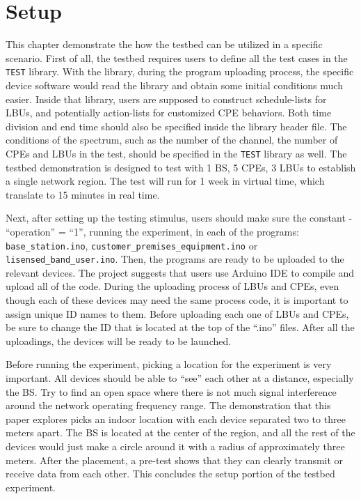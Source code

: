 \section{Setup}

This chapter demonstrate the how the testbed can be utilized in a specific scenario. First of all, the testbed requires users to define all the test cases in the \texttt{TEST} library. With the library, during the program uploading process, the specific device software would read the library and obtain some initial conditions much easier. Inside that library, users are supposed to construct schedule-lists for LBUs, and potentially action-lists for customized CPE behaviors. Both time division and end time should also be specified inside the library header file. The conditions of the spectrum, such as the number of the channel, the number of CPEs and LBUs in the test, should be specified in the \texttt{TEST} library as well. The testbed demonstration is designed to test with 1 BS, 5 CPEs, 3 LBUs to establish a single network region. The test will run for 1 week in virtual time, which translate to 15 minutes in real time.

Next, after setting up the testing stimulus, users should make sure the constant - ``operation'' = ``1'', running the experiment, in each of the programs: \texttt{base\_station.ino}, \texttt{customer\_premises\_equipment.ino} or \texttt{lisensed\_band\_user.ino}. Then, the programs are ready to be uploaded to the relevant devices. The project suggests that users use Arduino IDE to compile and upload all of the code. During the uploading process of LBUs and CPEs, even though each of these devices may need the same process code, it is important to assign unique ID names to them. Before uploading each one of LBUs and CPEs, be sure to change the ID that is located at the top of the ``.ino'' files. After all the uploadings, the devices will be ready to be launched. 

Before running the experiment, picking a location for the experiment is very important. All devices should be able to ``see'' each other at a distance, especially the BS. Try to find an open space where there is not much signal interference around the network operating frequency range. The demonstration that this paper explores picks an indoor location with each device separated two to three meters apart. The BS is located at the center of the region, and all the rest of the devices would just make a circle around it with a radius of approximately three meters. After the placement, a pre-test shows that they can clearly transmit or receive data from each other. This concludes the setup portion of the testbed experiment.

